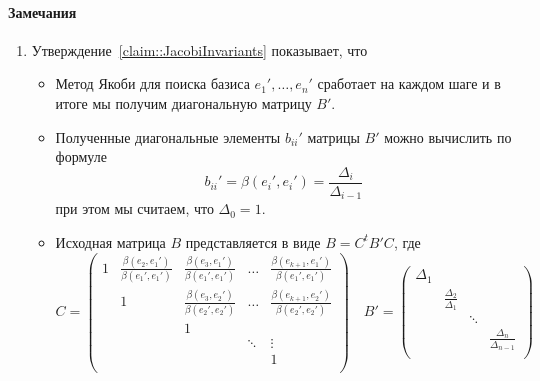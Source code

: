 \paragraph{Замечания}

\begin{enumerate}
\item Утверждение~\ref{claim::JacobiInvariants} показывает, что 
\begin{itemize}
\item Метод Якоби для поиска базиса $e_1',\ldots,e_n'$ сработает на каждом шаге и в итоге мы получим диагональную матрицу $B'$.

\item Полученные диагональные элементы $b_{ii}'$ матрицы $B'$ можно вычислить по формуле
\[
b_{ii}' = \beta(e_i',e_i') = \frac{\Delta_i}{\Delta_{i-1}}
\]
при этом мы считаем, что $\Delta_0 = 1$.

\item Исходная матрица $B$ представляется в виде $B = C^t B' C$, где
\[
C = 
\begin{pmatrix}
{1}&{\frac{\beta(e_2,e_1')}{\beta(e_1',e_1')}}&{\frac{\beta(e_3,e_1')}{\beta(e_1',e_1')}}&{\ldots}&{\frac{\beta(e_{k+1},e_1')}{\beta(e_1',e_1')}}\\
{}&{1}&{\frac{\beta(e_3,e_2')}{\beta(e_2',e_2')}}&{\ldots}&{\frac{\beta(e_{k+1},e_2')}{\beta(e_2',e_2')}}\\
{}&{}&{1}&{}&{}\\
{}&{}&{}&{\ddots}&{\vdots}\\
{}&{}&{}&{}&{1}\\
\end{pmatrix}
\quad
B' =
\begin{pmatrix}
{\Delta_1}&{}&{}&{}\\
{}&{\frac{\Delta_2}{\Delta_1}}&{}&{}\\
{}&{}&{\ddots}&{}\\
{}&{}&{}&{\frac{\Delta_n}{\Delta_{n-1}}}\\
\end{pmatrix}
\]
\end{itemize}


\end{enumerate}
